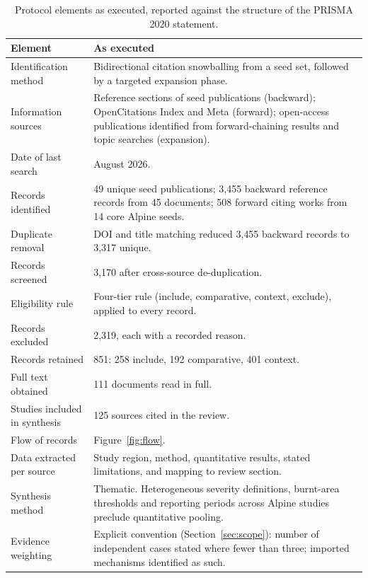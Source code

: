 \documentclass[11pt,a4paper]{article}
\begin{document}
\begin{table}[htbp]
\centering
\caption{Protocol elements as executed, reported against the structure of the PRISMA 2020 statement.}
\label{tab:prisma}
\small
\begin{tabularx}{\textwidth}{@{}lX@{}}
\toprule
\textbf{Element} & \textbf{As executed} \\
\midrule
Identification method & Bidirectional citation snowballing from a seed set, followed by a targeted expansion phase. \\
Information sources & Reference sections of seed publications (backward); OpenCitations Index and Meta (forward); open-access publications identified from forward-chaining results and topic searches (expansion). \\
Date of last search & August 2026. \\
Records identified & 49 unique seed publications; 3{,}455 backward reference records from 45 documents; 508 forward citing works from 14 core Alpine seeds. \\
Duplicate removal & DOI and title matching reduced 3{,}455 backward records to 3{,}317 unique. \\
Records screened & 3{,}170 after cross-source de-duplication. \\
Eligibility rule & Four-tier rule (include, comparative, context, exclude), applied to every record. \\
Records excluded & 2{,}319, each with a recorded reason. \\
Records retained & 851: 258 include, 192 comparative, 401 context. \\
Full text obtained & 111 documents read in full. \\
Studies included in synthesis & 125 sources cited in the review. \\
Flow of records & Figure~\ref{fig:flow}. \\
Data extracted per source & Study region, method, quantitative results, stated limitations, and mapping to review section. \\
Synthesis method & Thematic. Heterogeneous severity definitions, burnt-area thresholds and reporting periods across Alpine studies preclude quantitative pooling. \\
Evidence weighting & Explicit convention (Section~\ref{sec:scope}): number of independent cases stated where fewer than three; imported mechanisms identified as such. \\
\bottomrule
\end{tabularx}
\end{table}
\end{document}
